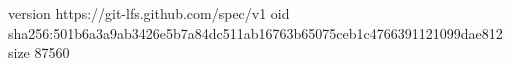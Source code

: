 version https://git-lfs.github.com/spec/v1
oid sha256:501b6a3a9ab3426e5b7a84dc511ab16763b65075ceb1c4766391121099dae812
size 87560
